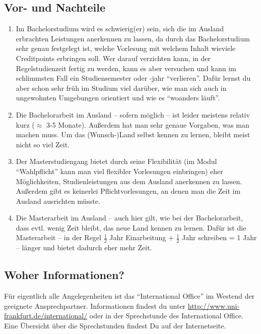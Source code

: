 \subsection{Vor- und Nachteile}
\begin{enumerate}
	\item Im Bachelorstudium wird es schwierig(er) sein, sich die im Ausland erbrachten Leistungen anerkennen zu lassen, da durch das Bachelorstudium sehr genau festgelegt ist, welche Vorlesung mit welchem Inhalt wieviele Creditpoints erbringen soll. Wer darauf verzichten kann, in der Regelstudienzeit fertig zu werden, kann es aber versuchen und kann im schlimmsten Fall ein Studiensemester oder -jahr \enquote{verlieren}. Dafür lernst du aber schon sehr früh im Studium viel darüber, wie man sich auch in ungewohnten Umgebungen orientiert und wie es \enquote{woanders läuft}.
	\item Die Bachelorarbeit im Ausland -- sofern möglich -- ist leider meistens relativ kurz ($\approx$ 3-5 Monate). Außerdem hat man sehr genaue Vorgaben, was man machen muss. Um das (Wunsch-)Land selbst kennen zu lernen, bleibt meist nicht so viel Zeit.
	\item Der Masterstudiengang bietet durch seine Flexibilität (im Modul \enquote{Wahlpflicht} kann man viel flexibler Vorlesungen einbringen) eher Möglichkeiten, Studienleistungen aus dem Ausland anerkennen zu lassen. Außerdem gibt es keinerlei Pflichtvorlesungen, an denen man die Zeit im Ausland ausrichten müsste.
	\item Die Masterarbeit im Ausland -- auch hier gilt, wie bei der Bachelorarbeit, dass evtl. wenig Zeit bleibt, das neue Land kennen zu lernen. Dafür ist die Masterarbeit -- in der Regel $\frac{1}{2}$ Jahr Einarbeitung + $\frac{1}{2}$ Jahr schreiben = 1 Jahr -- länger und bietet dadurch eher mehr Zeit.
\end{enumerate}

\subsection{Woher Informationen?}
Für eigentlich alle Angelegenheiten ist das \enquote{International Office} im Westend der geeignete Ansprechpartner. Informationen findest du unter \url{http://www.uni-frankfurt.de/international/} oder in der Sprechstunde des International Office. Eine Übersicht über die Sprechstunden findest Du auf der Internetseite.

